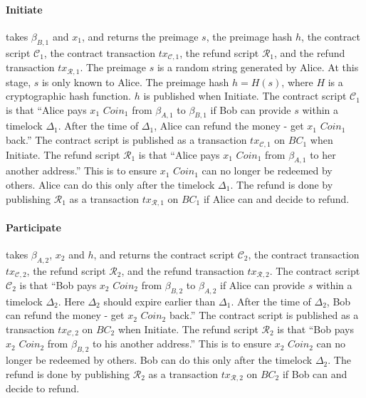 \paragraph{Initiate}
takes $\beta_{B, 1}$ and $x_1$,
and returns the preimage $s$, the preimage hash $h$, the contract script $\mathcal{C}_1$, the contract transaction $tx_{\mathcal{C}, 1}$, the refund script $\mathcal{R}_1$, and the refund transaction $tx_{\mathcal{R}, 1}$.
The preimage $s$ is a random string generated by Alice. At this stage, $s$ is only known to Alice.
The preimage hash $h = H(s)$, where $H$ is a cryptographic hash function.  $h$ is published when Initiate.
The contract script $\mathcal{C}_1$ is that ``Alice pays $x_1$ $Coin_1$ from $\beta_{A, 1}$ to $\beta_{B, 1}$ if Bob can provide $s$ within a timelock $\Delta_1$. After the time of $\Delta_1$, Alice can refund the money - get $x_1$ $Coin_1$ back.''
The contract script is published as a transaction $tx_{\mathcal{C}, 1}$ on $BC_1$ when Initiate.
The refund script $\mathcal{R}_1$ is that ``Alice pays $x_1$ $Coin_1$ from $\beta_{A, 1}$ to her another address.'' This is to ensure $x_1$ $Coin_1$ can no longer be redeemed by others. Alice can do this only after the timelock $\Delta_1$.
The refund is done by publishing $\mathcal{R}_1$ as a transaction $tx_{\mathcal{R}, 1}$ on $BC_1$ if Alice can and decide to refund.

\paragraph{Participate}
takes $\beta_{A, 2}$, $x_2$ and $h$,
and returns the contract script $\mathcal{C}_2$, the contract transaction $tx_{\mathcal{C}, 2}$, the refund script $\mathcal{R}_2$, and the refund transaction $tx_{\mathcal{R}, 2}$.
The contract script $\mathcal{C}_2$ is that ``Bob pays $x_2$ $Coin_2$ from $\beta_{B, 2}$ to $\beta_{A, 2}$ if Alice can provide $s$ within a timelock $\Delta_2$. Here $\Delta_2$ should expire earlier than $\Delta_1$. After the time of $\Delta_2$, Bob can refund the money - get $x_2$ $Coin_2$ back.''
The contract script is published as a transaction $tx_{\mathcal{C}, 2}$ on $BC_2$ when Initiate.
The refund script $\mathcal{R}_2$ is that ``Bob pays $x_2$ $Coin_2$ from $\beta_{B, 2}$ to his another address.'' This is to ensure $x_2$ $Coin_2$ can no longer be redeemed by others. Bob can do this only after the timelock $\Delta_2$.
The refund is done by publishing $\mathcal{R}_2$ as a transaction $tx_{\mathcal{R}, 2}$ on $BC_2$ if Bob can and decide to refund.

